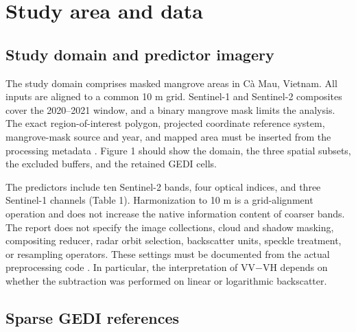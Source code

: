 \section{Study area and data}

\subsection{Study domain and predictor imagery}

The study domain comprises masked mangrove areas in Cà Mau, Vietnam. All inputs are aligned to a common 10 m grid. Sentinel-1 and Sentinel-2 composites cover the 2020--2021 window, and a binary mangrove mask limits the analysis. The exact region-of-interest polygon, projected coordinate reference system, mangrove-mask source and year, and mapped area must be inserted from the processing metadata . Figure 1 should show the domain, the three spatial subsets, the excluded buffers, and the retained GEDI cells.

\begin{table}[t]
\centering
\small
\setlength{\tabcolsep}{3pt}
\caption{Predictor groups. The optical-only model uses 14 channels; the fused models use all 17.}
\end{table}

The predictors include ten Sentinel-2 bands, four optical indices, and three Sentinel-1 channels (Table 1). Harmonization to 10 m is a grid-alignment operation and does not increase the native information content of coarser bands. The report does not specify the image collections, cloud and shadow masking, compositing reducer, radar orbit selection, backscatter units, speckle treatment, or resampling operators. These settings must be documented from the actual preprocessing code . In particular, the interpretation of VV$-$VH depends on whether the subtraction was performed on linear or logarithmic backscatter.

\subsection{Sparse GEDI references}


